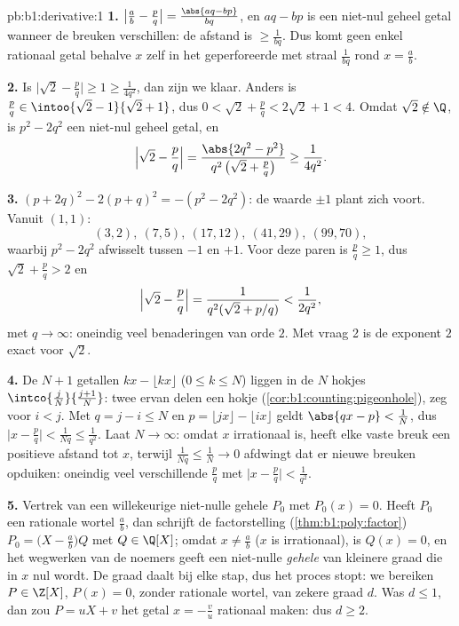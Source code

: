 \begin{solution}{pb:b1:derivative:1}
\textbf{1.} $\bigl|\frac ab - \frac pq\bigr| = \frac{\abs{aq -
bp}}{bq}$, en $aq - bp$ is een niet-nul geheel getal wanneer de
breuken verschillen: de afstand is $\geq \frac{1}{bq}$. Dus komt
geen enkel rationaal getal behalve $x$ zelf in het geperforeerde
 met straal $\frac{1}{bq}$ rond $x = \frac ab$.

\textbf{2.} Is $\bigl|\sqrt2 - \frac pq\bigr| \geq 1 \geq
\frac{1}{4q^2}$, dan zijn we klaar. Anders is $\frac pq \in
\intoo{\sqrt2 - 1}{\sqrt2 + 1}$, dus $0 < \sqrt2 + \frac pq <
2\sqrt2 + 1 < 4$. Omdat $\sqrt 2 \notin \Q$, is $p^2 - 2q^2$ een
niet-nul geheel getal, en
\[
\Bigl|\sqrt2 - \frac pq\Bigr|
= \frac{\abs{2q^2 - p^2}}{q^2\,\bigl(\sqrt2 + \frac pq\bigr)}
\geq \frac{1}{4q^2} .
\]

\textbf{3.} $(p + 2q)^2 - 2(p + q)^2 = -(p^2 - 2q^2)$: de waarde
$\pm1$ plant zich voort. Vanuit $(1,1)$:
\[
(3,2),\ (7,5),\ (17,12),\ (41,29),\ (99,70),
\]
waarbij $p^2 - 2q^2$ afwisselt tussen $-1$ en $+1$. Voor deze
paren is $\frac pq \geq 1$, dus $\sqrt2 + \frac pq > 2$ en
\[
\Bigl|\sqrt2 - \frac pq\Bigr| =
\frac{1}{q^2(\sqrt2 + p/q)} < \frac{1}{2q^2} ,
\]
met $q \to \infty$: oneindig veel benaderingen van orde $2$. Met
vraag 2 is de exponent $2$ exact voor $\sqrt 2$.

\textbf{4.} De $N + 1$ getallen $kx - \lfloor kx\rfloor$ ($0
\leq k \leq N$) liggen in de $N$ hokjes $\intco{\frac
jN}{\frac{j+1}{N}}$: twee ervan delen een hokje
(\cref{cor:b1:counting:pigeonhole}), zeg voor $i < j$. Met $q =
j - i \leq N$ en $p = \lfloor jx\rfloor - \lfloor ix\rfloor$
geldt $\abs{qx - p} < \frac1N$, dus $\bigl|x - \frac pq\bigr| <
\frac{1}{Nq} \leq \frac{1}{q^2}$. Laat $N \to \infty$: omdat $x$
irrationaal is, heeft elke vaste breuk een positieve afstand tot
$x$, terwijl $\frac{1}{Nq} \leq \frac 1N \to 0$ afdwingt dat er
nieuwe breuken opduiken: oneindig veel verschillende $\frac pq$
met $\bigl|x - \frac pq\bigr| < \frac{1}{q^2}$.

\textbf{5.} Vertrek van een willekeurige niet-nulle gehele $P_0$
met $P_0(x) = 0$. Heeft $P_0$ een rationale wortel $\frac ab$, dan
schrijft de factorstelling (\cref{thm:b1:poly:factor}) $P_0 =
\bigl(X - \frac ab\bigr)Q$ met $Q \in \Q[X]$; omdat $x \neq \frac
ab$ ($x$ is irrationaal), is $Q(x) = 0$, en het wegwerken van de
noemers geeft een niet-nulle \emph{gehele}  van kleinere
graad die in $x$ nul wordt. De graad daalt bij elke stap, dus het
proces stopt: we bereiken $P \in \Z[X]$, $P(x) = 0$, zonder
rationale wortel, van zekere graad $d$. Was $d \leq 1$, dan zou $P
= uX + v$ het getal $x = -\frac vu$ rationaal maken: dus $d \geq
2$.


\end{solution}

